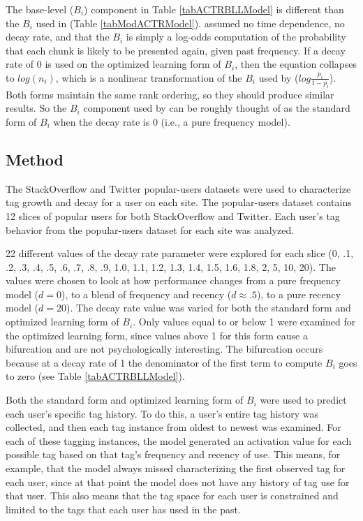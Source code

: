 \documentclass[man,floatsintext,donotrepeattitle]{apa6}
\begin{document}
The base-level ($B_{i}$) component in Table \ref{tabACTRBLLModel} is different than the $B_{i}$ used in \textcite{Stanley2013} (Table \ref{tabModACTRModel}).
\citeauthor{Stanley2013} assumed no time dependence, no decay rate, and that the $B_{i}$ is simply a log-odds computation of the probability that each chunk is likely to be presented again, given past frequency.
If a decay rate of 0 is used on the optimized learning form of $B_{i}$, then the equation collapses to $log \left ( n_{i} \right )$,
which is a nonlinear transformation of the $B_{i}$ used by \citeauthor{Stanley2013} ($log \frac{p_{i}}{1-p_{i}}$).
Both forms maintain the same rank ordering, so they should produce similar results.
So the $B_{i}$ component used by \citeauthor{Stanley2013} can be roughly thought of as the standard form of $B_{i}$ when the decay rate is 0 (i.e., a pure frequency model).

\subsection{Method}

The StackOverflow and Twitter popular-users datasets were used to characterize tag growth and decay for a user on each site.
The popular-users dataset contains 12 slices of popular users for both StackOverflow and Twitter.
Each user's tag behavior from the popular-users dataset for each site was analyzed. 

22 different values of the decay rate parameter were explored for each slice
(0, .1, .2, .3, .4, .5, .6, .7, .8, .9, 1.0, 1.1, 1.2, 1.3, 1.4, 1.5, 1.6, 1.8, 2, 5, 10, 20).
The values were chosen to look at how performance changes from a pure frequency model ($d=0$), to a blend of frequency and recency ($d \approx .5$), to a pure recency model ($d=20$).
The decay rate value was varied for both the standard form and optimized learning form of $B_{i}$. 
Only values equal to or below 1 were examined for the optimized learning form, since values above 1 for this form cause a bifurcation and are not psychologically interesting.
The bifurcation occurs because at a decay rate of 1 the denominator of the first term to compute $B_{i}$ goes to zero (see Table \ref{tabACTRBLLModel}).

Both the standard form and optimized learning form of $B_{i}$ were used to predict each user's specific tag history.
To do this, a user's entire tag history was collected, and then each tag instance from oldest to newest was examined.
For each of these tagging instances, the model generated an activation value for each possible tag based on that tag's frequency and recency of use. 
This means, for example, that the model always missed characterizing the first observed tag for each user, since at that point the model does not have any history of tag use for that user.
This also means that the tag space for each user is constrained and limited to the tags that each user has used in the past.
\end{document}
